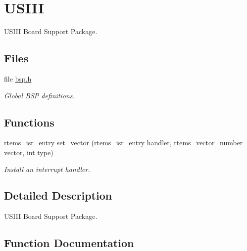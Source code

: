 \hypertarget{group__RTEMSBSPsSPARC64USIII}{}\section{U\+S\+I\+II}
\label{group__RTEMSBSPsSPARC64USIII}


U\+S\+I\+II Board Support Package.  


\subsection*{Files}
\begin{DoxyCompactItemize}
\item 
file \mbox{\hyperlink{bsps_2sparc64_2usiii_2include_2bsp_8h}{bsp.\+h}}
\begin{DoxyCompactList}\small\item\em Global B\+SP definitions. \end{DoxyCompactList}\end{DoxyCompactItemize}
\subsection*{Functions}
\begin{DoxyCompactItemize}
\item 
rtems\+\_\+isr\+\_\+entry \mbox{\hyperlink{group__RTEMSBSPsSPARC64USIII_gab3388042c56b34c40be81fd5f028d97e}{set\+\_\+vector}} (rtems\+\_\+isr\+\_\+entry handler, \mbox{\hyperlink{group__ClassicINTR_ga3e434c197d99f128e78cae4d9358bd8b}{rtems\+\_\+vector\+\_\+number}} vector, int type)
\begin{DoxyCompactList}\small\item\em Install an interrupt handler. \end{DoxyCompactList}\end{DoxyCompactItemize}


\subsection{Detailed Description}
U\+S\+I\+II Board Support Package. 



\subsection{Function Documentation}
\mbox{\label{group__RTEMSBSPsSPARC64USIII_gab3388042c56b34c40be81fd5f028d97e}} 
